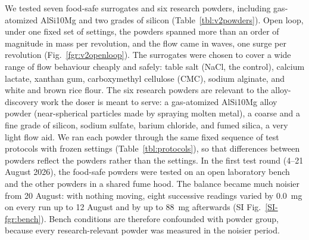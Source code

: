 \documentclass[twoside,twocolumn,9pt]{article}
\newcommand{\siref}[1]{\ref*{SI-#1}}
\begin{document}
We tested seven food-safe surrogates and six research powders, including gas-atomized AlSi10Mg and two grades of silicon (Table~\ref{tbl:v2powders}). Open loop, under one fixed set of settings, the powders spanned more than an order of magnitude in mass per revolution, and the flow came in waves, one surge per revolution (Fig.~\ref{fgr:v2openloop}). The surrogates were chosen to cover a wide range of flow behaviour cheaply and safely: table salt (NaCl, the control), calcium lactate, xanthan gum, carboxymethyl cellulose (CMC), sodium alginate, and white and brown rice flour. The six research powders are relevant to the alloy-discovery work the doser is meant to serve: a gas-atomized AlSi10Mg alloy powder (near-spherical particles made by spraying molten metal), a coarse and a fine grade of silicon, sodium sulfate, barium chloride, and fumed silica, a very light flow aid. We ran each powder through the same fixed sequence of test protocols with frozen settings (Table~\ref{tbl:protocols}), so that differences between powders reflect the powders rather than the settings. In the first test round (4--21 August 2026), the food-safe powders were tested on an open laboratory bench and the other powders in a shared fume hood. The balance became much noisier from 20 August: with nothing moving, eight successive readings varied by 0.0~mg on every run up to 12 August and by up to 88~mg afterwards (SI Fig.~\siref{fgr:bench}). Bench conditions are therefore confounded with powder group, because every research-relevant powder was measured in the noisier period.


\end{document}
